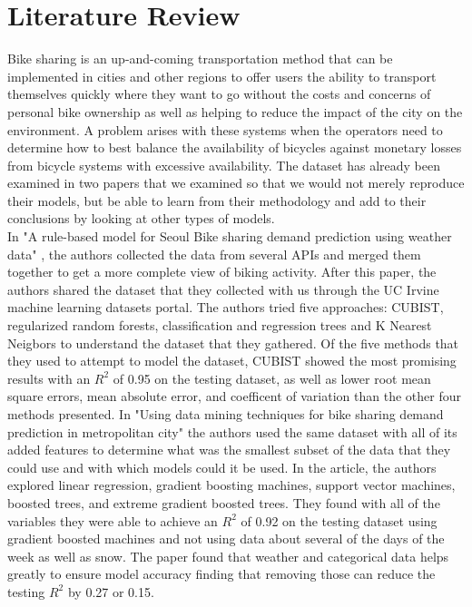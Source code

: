 \documentclass[main.tex]{subfiles}
\begin{document}
\section{Literature Review}
Bike sharing is an up-and-coming transportation method that can be implemented in cities and other regions to offer users the ability to transport themselves quickly where they want to go without the costs and concerns of personal bike ownership as well as helping to reduce the impact of the city on the environment. A problem arises with these systems when the operators need to determine how to best balance the availability of bicycles against monetary losses from bicycle systems with excessive availability.
The dataset\cite{Irvine} has already been examined in two papers\cite{datamining}\cite{rulebased} that we examined so that we would not merely reproduce their models, but be able to learn from their methodology and add to their conclusions by looking at other types of models.\\
In "A rule-based model for Seoul Bike sharing demand prediction using weather data" \cite{rulebased}, the authors collected the data from several APIs and merged them together to get a more complete view of biking activity. After this paper, the authors shared the dataset that they collected with us through the UC Irvine machine learning datasets portal\cite{Irvine}. The authors tried five approaches: CUBIST, regularized random forests, classification and regression trees and K Nearest Neigbors to understand the dataset that they gathered. Of the five methods that they used to attempt to model the dataset, CUBIST showed the most promising results with an $R^2$ of 0.95 on the testing dataset, as well as lower root mean square errors, mean absolute error, and coefficent of variation than the other four methods presented. 
In "Using data mining techniques for bike sharing demand prediction in metropolitan city" \cite{datamining} the authors used the same dataset with all of its added features to determine what was the smallest subset of the data that they could use and with which models could it be used. In the article, the authors explored linear regression, gradient boosting machines, support vector machines, boosted trees, and extreme gradient boosted trees. They found with all of the variables they were able to achieve an $R^2$ of 0.92 on the testing dataset using gradient boosted machines and not using data about several of the days of the week as well as snow. The paper found that weather and categorical data helps greatly to ensure model accuracy finding that removing those can reduce the testing $R^2$ by 0.27 or 0.15. 
\end{document}
